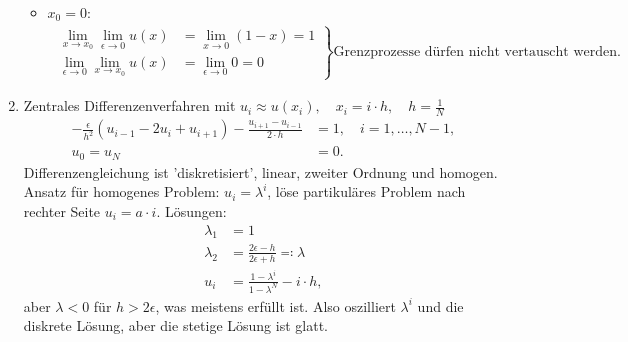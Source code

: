 \begin{enumerate}
\begin{itemize}
\item $x_{0} = 0$:
\begin{align*}\left. 
  \begin{aligned}
    \lim_{x \to x_{0}} \lim_{\epsilon \to 0} u(x) &= \lim_{x \to 0} (1 - x) = 1\\
    \lim_{\epsilon \to 0} \lim_{x \to x_{0}} u(x) &= \lim_{ \epsilon \to 0}  0 = 0
  \end{aligned} \right\}\text{Grenzprozesse dürfen nicht vertauscht werden}. 
\end{align*}
\end{itemize}
\item Zentrales Differenzenverfahren mit $u_{i} \approx u(x_{i}), \quad x_{i} = i\cdot h, \quad h = \frac 1 N$
  \begin{align*}
    - \frac \epsilon {h^{2}} (u_{i-1} - 2u_{i} + u_{i+1})- \frac {u_{i+1} - u_{i-1}} {2\cdot h} &= 1, \quad i = 1, \dots, N-1,\\
u_{0} = u_{N} &= 0. 
  \end{align*}
Differenzengleichung ist 'diskretisiert', linear, zweiter Ordnung und homogen. Ansatz für homogenes Problem: $u_{i} = \lambda^{i}$, löse partikuläres Problem nach rechter Seite $u_{i} = a \cdot i$. Lösungen:
\begin{align*}
  \lambda_{1} &= 1\\
   \lambda_{2} &= \frac{2 \epsilon - h}{2 \epsilon + h} \eqqcolon \lambda\\
   u_{i} &= \frac{1 - \lambda^{i}}{1 - \lambda^{N}} - i\cdot h, 
\end{align*}
aber $\lambda < 0$ für $h > 2 \epsilon$, was meistens erfüllt ist. Also oszilliert $\lambda^{i}$ und die diskrete Lösung, aber die stetige Lösung ist glatt. 


\end{enumerate}
